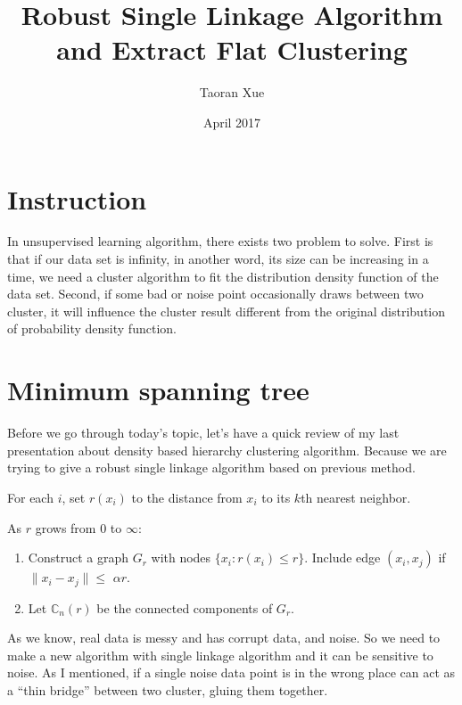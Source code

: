 \documentclass{article}
\title{Robust Single Linkage Algorithm and Extract Flat Clustering}
\author{Taoran Xue }
\date{April 2017}
\begin{document}
\maketitle

\section{Instruction}

In unsupervised learning algorithm, there exists two problem to solve. First is that if our data set is infinity, in another word, its size can be increasing in a time, we need a cluster algorithm to fit the distribution density function of the data set. Second, if some bad or noise point occasionally draws between two cluster, it will influence the cluster result different from the original distribution of probability density function.

\section{Minimum spanning tree}

Before we go through today's topic, let's have a quick review of my last presentation about density based hierarchy clustering algorithm. Because we are trying to give a robust single linkage algorithm based on previous method.



\begin{tcolorbox}
For each $i$, set $r(x_i)$ to the distance from $x_i$ to its {\color{red}$k$}th nearest neighbor.

As $r$ grows from $0$ to $\infty$:
\begin{enumerate}
	\item Construct a graph $G_r$ with nodes $\{x_i : r(x_i) \leq r\}$. Include edge $(x_i, x_j)$ if $\|x_i - x_j\| \leq$ {\color{red}$\alpha r$}.
	\item Let $\mathbb{C}_n(r)$ be the connected components of $G_r$.
\end{enumerate}  

\end{tcolorbox}

As we know, real data is messy and has corrupt data, and noise. So we need to make a new algorithm with single linkage algorithm and it can be sensitive to noise. As I mentioned, if a single noise data point is in the wrong place can act as a ``thin bridge'' between two cluster, gluing them together.
\end{document}
